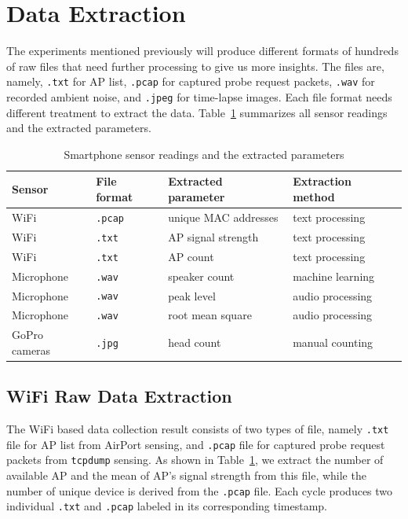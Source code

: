 \section{Data Extraction} %
\label{sec:data_extraction}
The experiments mentioned previously will produce different formats of hundreds of raw files that need further processing to give us more insights. The files are, namely, \verb|.txt| for \ac{AP} list, \verb|.pcap| for captured probe request packets, \verb|.wav| for recorded ambient noise, and \verb|.jpeg| for time-lapse images. Each file format needs different treatment to extract the data. Table~\ref{tab:sensor-parameters} summarizes all sensor readings and the extracted parameters.

\begin{table}[]
\centering
\caption{Smartphone sensor readings and the extracted parameters}
\label{tab:sensor-parameters}
\begin{tabular}{llll}\toprule
Sensor     & File format & Extracted parameter & Extraction method\\ \midrule
WiFi       & \verb|.pcap| & unique \ac{MAC} addresses     & text processing \\
WiFi       & \verb|.txt| & \ac{AP} signal strength     & text processing \\
WiFi       & \verb|.txt| & \ac{AP} count            & text processing \\
Microphone & \verb|.wav| & speaker count       & machine learning \\
Microphone & \verb|.wav| & peak level          & audio processing \\
Microphone & \verb|.wav| & root mean square    & audio processing \\
GoPro cameras & \verb|.jpg| & head count       & manual counting\\
\bottomrule
\end{tabular}
\end{table}

\subsection{WiFi Raw Data Extraction} %
\label{sub:wifi_raw_data_extraction}
The WiFi based data collection result consists of two types of file, namely \verb|.txt| file for \ac{AP} list from AirPort sensing, and \verb|.pcap| file for captured probe request packets from \verb|tcpdump| sensing. As shown in Table~\ref{tab:sensor-parameters}, we extract the number of available \ac{AP} and the mean of \ac{AP}'s signal strength from this file, while the number of unique device is derived from the \verb|.pcap| file. Each cycle produces two individual \verb|.txt| and \verb|.pcap| labeled in its corresponding timestamp.

